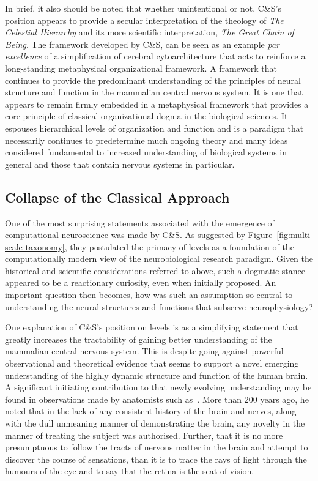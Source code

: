 \documentclass[11pt,3p,twocolumn]{JMN}
\begin{document}
In brief, it also should be noted that whether unintentional or not, C\&S's position appears to provide a secular interpretation of the theology of {\it{The Celestial Hierarchy}} and its more scientific interpretation, {\it{The Great Chain of Being}}. The framework developed by C\&S, can be seen as an example {\it{par\,excellence}} of a simplification of cerebral cytoarchitecture that acts to reinforce a long-standing metaphysical organizational framework. A framework that continues to provide the predominant understanding of the principles of neural structure and function in the mammalian central nervous system. It is one that appears to remain firmly embedded in a metaphysical framework that provides a core principle of classical organizational dogma in the biological sciences. It espouses hierarchical levels of organization and function and is a paradigm that necessarily continues to predetermine much ongoing theory and many ideas considered fundamental to increased understanding of biological systems in general and those that contain nervous systems in particular.

\subsection{Collapse of the Classical Approach}

One of the most surprising statements associated with the emergence of computational neuroscience was made by C\&S. As suggested by Figure~\ref{fig:multi-scale-taxonomy}, they postulated the primacy of levels as a foundation of the computationally modern view of the neurobiological research paradigm. Given the historical and scientific considerations referred to above, such a dogmatic stance appeared to be a reactionary curiosity, even when initially proposed. An important question then becomes, how was such an assumption so central to understanding the neural structures and functions that subserve neurophysiology?

One explanation of C\&S's position on levels is as a simplifying statement that greatly increases the tractability of gaining better understanding of the mammalian central nervous system. This is despite going against powerful observational and theoretical evidence that seems to support a novel emerging understanding of the highly dynamic structure and function of the human brain. A significant initiating contribution to that newly evolving understanding may be found in observations made by anatomists such as~\citet{bell11}. More than 200 years ago, he noted that in the lack of any consistent history of the brain and nerves, along with the dull unmeaning manner of demonstrating the brain, any novelty in the manner of treating the subject was authorised. Further, that it is no more presumptuous to follow the tracts of nervous matter in the brain and attempt to discover the course of sensations, than it is to trace the rays of light through the humours of the eye and to say that the retina is the seat of vision.
\end{document}
